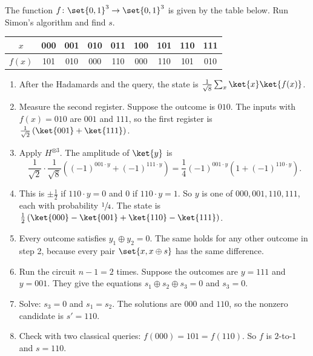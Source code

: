 \begin{exercisebox}
\begin{pproblem}[Simon with $n = 3$]\label{pp:simon}
    The function $f \colon \set{0,1}^3 \to \set{0,1}^3$ is given by the table below. Run Simon's
    algorithm and find $s$.
    \begin{center}
        \begin{tabular}{c|cccccccc}
            $x$    & 000 & 001 & 010 & 011 & 100 & 101 & 110 & 111 \\ \hline
            $f(x)$ & 101 & 010 & 000 & 110 & 000 & 110 & 101 & 010
        \end{tabular}
    \end{center}
\end{pproblem}
\tcblower
\begin{wsolution}
    \leavevmode
    \begin{enumerate}
        \item After the Hadamards and the query, the state is
              $\frac{1}{\sqrt{8}} \sum_{x} \ket{x}\ket{f(x)}$.
        \item Measure the second register. Suppose the outcome is $010$. The inputs with
              $f(x) = 010$ are $001$ and $111$, so the first register is
              $\frac{1}{\sqrt{2}}\left(\ket{001} + \ket{111}\right)$.
        \item Apply $H^{\otimes 3}$. The amplitude of $\ket{y}$ is
              \[\frac{1}{\sqrt{2}} \cdot \frac{1}{\sqrt{8}} \left((-1)^{001 \cdot y} + (-1)^{111 \cdot y}\right)
                  = \frac{1}{4} (-1)^{001 \cdot y} \left(1 + (-1)^{110 \cdot y}\right).\]
        \item This is $\pm\frac{1}{2}$ if $110 \cdot y = 0$ and $0$ if $110 \cdot y = 1$. So $y$ is
              one of $000, 001, 110, 111$, each with probability $\sfrac{1}{4}$. The state is
              $\frac{1}{2}\left(\ket{000} - \ket{001} + \ket{110} - \ket{111}\right)$.
        \item Every outcome satisfies $y_1 \oplus y_2 = 0$. The same holds for any other outcome in
              step 2, because every pair $\set{x, x \oplus s}$ has the same difference.
        \item Run the circuit $n - 1 = 2$ times. Suppose the outcomes are $y = 111$ and $y = 001$.
              They give the equations $s_1 \oplus s_2 \oplus s_3 = 0$ and $s_3 = 0$.
        \item Solve: $s_3 = 0$ and $s_1 = s_2$. The solutions are $000$ and $110$, so the nonzero
              candidate is $s' = 110$.
        \item Check with two classical queries: $f(000) = 101 = f(110)$. So $f$ is $2$-to-$1$ and
              $s = 110$.
    \end{enumerate}


\end{wsolution}
\end{exercisebox}
